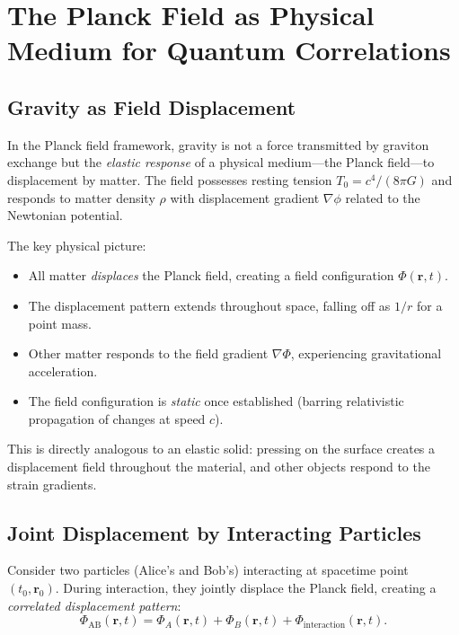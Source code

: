 \documentclass[11pt,a4paper]{article}
\newcommand{\Tzero}{\ensuremath{T_0}}
\theoremstyle{definition}
\theoremstyle{remark}
\begin{document}
\section{The Planck Field as Physical Medium for Quantum Correlations}
\label{sec:planck_field_medium}

\subsection{Gravity as Field Displacement}
\label{sec:gravity_displacement}

In the Planck field framework, gravity is not a force transmitted by graviton exchange but the \emph{elastic response} of a physical medium---the Planck field---to displacement by matter. The field possesses resting tension $\Tzero = c^4/(8\pi G)$ and responds to matter density $\rho$ with displacement gradient $\nabla \phi$ related to the Newtonian potential.

The key physical picture:
\begin{itemize}[leftmargin=*, itemsep=0.2em]
\item All matter \emph{displaces} the Planck field, creating a field configuration $\Phi(\mathbf{r},t)$.
\item The displacement pattern extends throughout space, falling off as $1/r$ for a point mass.
\item Other matter responds to the field gradient $\nabla \Phi$, experiencing gravitational acceleration.
\item The field configuration is \emph{static} once established (barring relativistic propagation of changes at speed $c$).
\end{itemize}

This is directly analogous to an elastic solid: pressing on the surface creates a displacement field throughout the material, and other objects respond to the strain gradients.

\subsection{Joint Displacement by Interacting Particles}
\label{sec:joint_displacement}

Consider two particles (Alice's and Bob's) interacting at spacetime point $(t_0, \mathbf{r}_0)$. During interaction, they jointly displace the Planck field, creating a \emph{correlated displacement pattern}:
\begin{equation}
\label{eq:joint_displacement}
\Phi_{\mathrm{AB}}(\mathbf{r},t) = \Phi_A(\mathbf{r},t) + \Phi_B(\mathbf{r},t) + \Phi_{\mathrm{interaction}}(\mathbf{r},t).
\end{equation}
\end{document}
